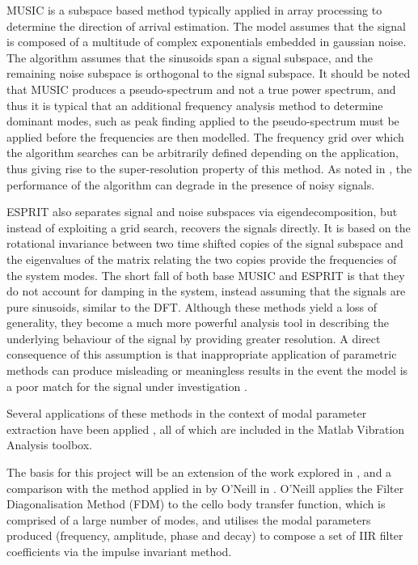 MUSIC is a subspace based method typically applied in array processing to determine the direction of arrival estimation. The model assumes that the signal is composed of a multitude of complex exponentials embedded in gaussian noise. The algorithm assumes that the sinusoids span a signal subspace, and the remaining noise subspace is orthogonal to the signal subspace. It should be noted that MUSIC produces a pseudo-spectrum and not a true power spectrum, and thus it is typical that an additional frequency analysis method to determine dominant modes, such as peak finding applied to the pseudo-spectrum must be applied before the frequencies are then modelled. The frequency grid over which the algorithm searches can be arbitrarily defined depending on the application, thus giving rise to the super-resolution property of this method. As noted in \cite{music1986}, the performance of the algorithm can degrade in the presence of noisy signals.

ESPRIT also separates signal and noise subspaces via eigendecomposition, but instead of exploiting a grid search, recovers the signals directly. It is based on the rotational invariance between two time shifted copies of the signal subspace and the eigenvalues of the matrix relating the two copies provide the frequencies of the system modes. The short fall of both base MUSIC and ESPRIT is that they do not account for damping in the system, instead assuming that the signals are pure sinusoids, similar to the DFT.
Although these methods yield a loss of generality, they become a much more powerful analysis tool in describing the underlying behaviour of the signal by providing greater resolution. A direct consequence of this assumption is that inappropriate application of parametric methods can produce misleading or meaningless results in the event the model is a poor match for the signal under investigation \cite{hayes}.

Several applications of these methods in the context of modal parameter extraction have been applied \cite{mode-extraction}, all of which are included in the Matlab Vibration Analysis toolbox.

The basis for this project will be an extension of the work explored in \cite{dafx2026}, and a comparison with the method applied in by O'Neill in \cite{oneill}. O'Neill applies the Filter Diagonalisation Method (FDM) \cite{fdm} to the cello body transfer function, which is comprised of a large number of modes, and utilises the modal parameters produced (frequency, amplitude, phase and decay) to compose a set of IIR filter coefficients via the impulse invariant method.


